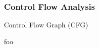 
\subsubsection{Control Flow Analysis}
\label{sec:lit_review_control_flow_analysis}

Control Flow Graph (CFG)

foo


\begin{figure}[htbp]
	\centering
	\begin{subfigure}[ht]{0.23\textwidth}
		\centering
		\begin{subfigure}[ht]{0.45\textwidth}
			
		\end{subfigure}
		\begin{subfigure}[ht]{0.42\textwidth}

\end{subfigure}
\end{subfigure}
\end{figure}
